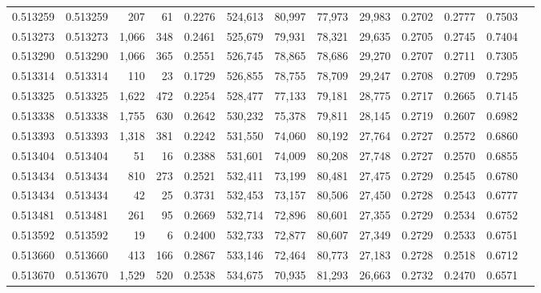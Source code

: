 \begin{tabular}{rrrrrrrrrrrrr}
0.513259 & 0.513259 &   207 &    61 &                                     0.2276 & 524,613 &  80,997 &  77,973 &  29,983 & 0.2702 & 0.2777 & 0.7503 \\
0.513273 & 0.513273 & 1,066 &   348 &                                     0.2461 & 525,679 &  79,931 &  78,321 &  29,635 & 0.2705 & 0.2745 & 0.7404 \\
0.513290 & 0.513290 & 1,066 &   365 &                                     0.2551 & 526,745 &  78,865 &  78,686 &  29,270 & 0.2707 & 0.2711 & 0.7305 \\
0.513314 & 0.513314 &   110 &    23 &                                     0.1729 & 526,855 &  78,755 &  78,709 &  29,247 & 0.2708 & 0.2709 & 0.7295 \\
0.513325 & 0.513325 & 1,622 &   472 &                                     0.2254 & 528,477 &  77,133 &  79,181 &  28,775 & 0.2717 & 0.2665 & 0.7145 \\
0.513338 & 0.513338 & 1,755 &   630 &                                     0.2642 & 530,232 &  75,378 &  79,811 &  28,145 & 0.2719 & 0.2607 & 0.6982 \\
0.513393 & 0.513393 & 1,318 &   381 &                                     0.2242 & 531,550 &  74,060 &  80,192 &  27,764 & 0.2727 & 0.2572 & 0.6860 \\
0.513404 & 0.513404 &    51 &    16 &                                     0.2388 & 531,601 &  74,009 &  80,208 &  27,748 & 0.2727 & 0.2570 & 0.6855 \\
0.513434 & 0.513434 &   810 &   273 &                                     0.2521 & 532,411 &  73,199 &  80,481 &  27,475 & 0.2729 & 0.2545 & 0.6780 \\
0.513434 & 0.513434 &    42 &    25 &                                     0.3731 & 532,453 &  73,157 &  80,506 &  27,450 & 0.2728 & 0.2543 & 0.6777 \\
0.513481 & 0.513481 &   261 &    95 &                                     0.2669 & 532,714 &  72,896 &  80,601 &  27,355 & 0.2729 & 0.2534 & 0.6752 \\
0.513592 & 0.513592 &    19 &     6 &                                     0.2400 & 532,733 &  72,877 &  80,607 &  27,349 & 0.2729 & 0.2533 & 0.6751 \\
0.513660 & 0.513660 &   413 &   166 &                                     0.2867 & 533,146 &  72,464 &  80,773 &  27,183 & 0.2728 & 0.2518 & 0.6712 \\
0.513670 & 0.513670 & 1,529 &   520 &                                     0.2538 & 534,675 &  70,935 &  81,293 &  26,663 & 0.2732 & 0.2470 & 0.6571 \\

\end{tabular}
